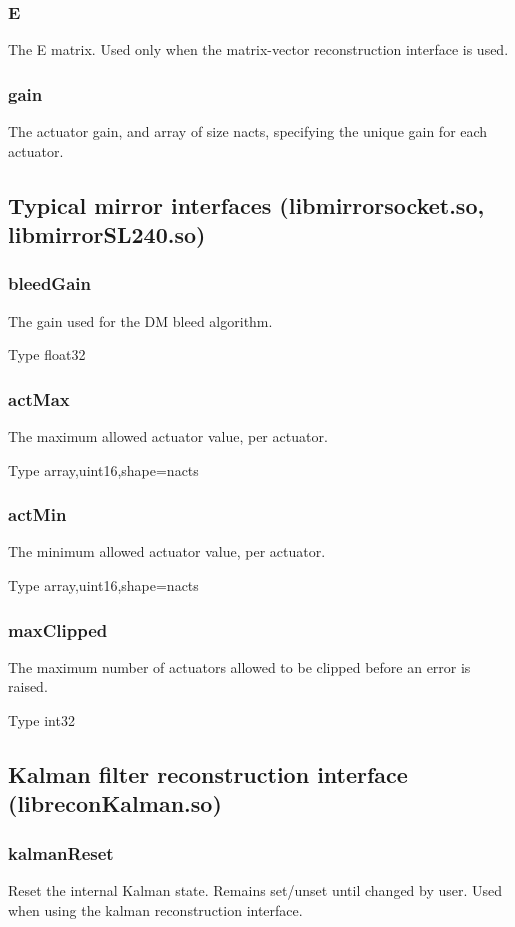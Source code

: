 \documentclass[a4,10pt]{article}
\begin{document}
\subsubsection{E}
The E matrix.  Used only when the
matrix-vector reconstruction interface is used.

\subsubsection{gain}
The actuator gain, and array of size nacts, specifying the unique gain for
each actuator.  

\subsection{Typical mirror interfaces (libmirrorsocket.so, libmirrorSL240.so)}

\subsubsection{bleedGain}
The gain used for the DM bleed algorithm.

Type float32

\subsubsection{actMax}
The maximum allowed actuator value, per actuator.

Type array,uint16,shape=nacts

\subsubsection{actMin}
The minimum allowed actuator value, per actuator.

Type array,uint16,shape=nacts

\subsubsection{maxClipped}
The maximum number of actuators allowed to be clipped before an error
is raised.

Type int32

\subsection{Kalman filter reconstruction interface (libreconKalman.so)}
\subsubsection{kalmanReset}
Reset the internal Kalman state.  Remains set/unset until changed by
user.  Used when using the kalman reconstruction interface.
\end{document}
